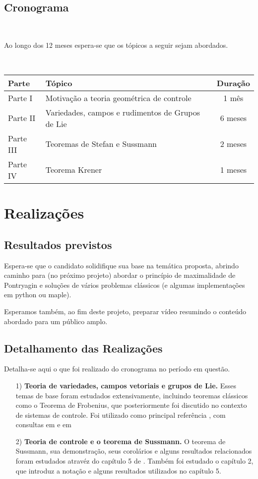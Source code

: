 \documentclass[11pt]{amsart}
\newcommand{\<}[0]{\langle}
\renewcommand{\>}[0]{\rangle}
\begin{document}
\subsection{Cronograma}
\label{Cronograma}

\

Ao longo dos 12 meses espera-se que os tópicos a seguir sejam abordados. 


\

\begin{tabular}{|l|l|c|} \hline
Parte   & Tópico   & Duração \\ \hline
Parte I &  Motivação a  teoria geométrica de controle &  1 mês \\ \hline
Parte II & Variedades, campos e rudimentos de Grupos de Lie &  6 meses  \\ \hline
Parte III & Teoremas de  Stefan e Sussmann  & 2 meses \\ \hline
Parte IV & Teorema Krener & 1 meses \\ \hline
\end{tabular}


\section{Realizações}

\subsection{Resultados previstos}
Espera-se que o candidato solidifique sua base na temática proposta, abrindo caminho  para 
(no próximo projeto)  abordar o princípio  de maximalidade
de Pontryagin e soluções de vários problemas clássicos (e algumas implementações em python ou maple).

Esperamos também, ao fim deste projeto, preparar
vídeo resumindo o conteúdo abordado para um público  amplo.  

\subsection{Detalhamento das Realizações}
Detalha-se aqui o que foi realizado do cronograma no período em questão.

\begin{itemize}
	\item[1)] \textbf{Teoria de variedades, campos vetoriais e grupos de Lie.} Esses temas de
	base foram estudados extensivamente, incluindo
	teoremas clássicos como o Teorema de Frobenius, que posteriormente
	foi discutido no contexto de sistemas de controle.
	Foi utilizado como principal referência \cite{Spivak}, com consultas em \cite{AlexBettiol}
	e em \cite{Lee}

	\item[2)] \textbf{Teoria de controle e o teorema de Sussmann.} O teorema de Sussmann,
	sua demonstração, seus corolários e alguns resultados relacionados foram estudados
	atravéz do capítulo 5 de \cite{Agrachev}. Também foi estudado
	o capítulo 2, que introduz a notação e alguns resultados utilizados no capítulo 5. 
\end{itemize}
\end{document}
